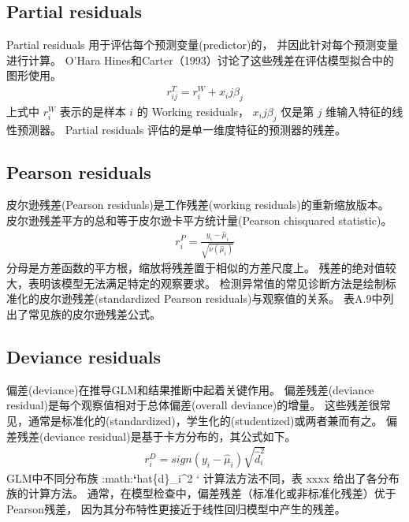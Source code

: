 \documentclass[letterpaper,10pt,english]{sphinxmanual}
\begin{document}
\subsection{Partial residuals}
\label{\detokenize{_u6a21_u578b_u8bc4_u4f30/content:partial-residuals}}
Partial residuals 用于评估每个预测变量(predictor)的，
并因此针对每个预测变量进行计算。
O’Hara Hines和Carter（1993）讨论了这些残差在评估模型拟合中的图形使用。
\begin{equation}\label{equation:模型评估/content:模型评估/content:30}
\begin{split}r^T_{ij} = r^W_{i} + x_ij \beta_j\end{split}
\end{equation}
上式中 \(r^W_{i}\) 表示的是样本 \(i\) 的 Working residuals，
\(x_ij \beta_j\) 仅是第 \(j\) 维输入特征的线性预测器。
Partial residuals 评估的是单一维度特征的预测器的残差。


\subsection{Pearson residuals}
\label{\detokenize{_u6a21_u578b_u8bc4_u4f30/content:pearson-residuals}}
皮尔逊残差(Pearson residuals)是工作残差(working residuals)的重新缩放版本。
皮尔逊残差平方的总和等于皮尔逊卡平方统计量(Pearson chi\sphinxhyphen{}squared statistic)。
\begin{equation}\label{equation:模型评估/content:模型评估/content:31}
\begin{split}r_i^P = \frac{y_i-\hat{\mu}_i}{\sqrt{\nu(\hat{\mu}_i)}}\end{split}
\end{equation}
分母是方差函数的平方根，缩放将残差置于相似的方差尺度上。
残差的绝对值较大，表明该模型无法满足特定的观察要求。
检测异常值的常见诊断方法是绘制标准化的皮尔逊残差(standardized Pearson residuals)与观察值的关系。
表A.9中列出了常见族的皮尔逊残差公式。


\subsection{Deviance residuals}
\label{\detokenize{_u6a21_u578b_u8bc4_u4f30/content:deviance-residuals}}
偏差(deviance)在推导GLM和结果推断中起着关键作用。
偏差残差(deviance residual)是每个观察值相对于总体偏差(overall deviance)的增量。
这些残差很常见，通常是标准化的(standardized)，学生化的(studentized)或两者兼而有之。
偏差残差(deviance residual)是基于卡方分布的，其公式如下。
\begin{equation}\label{equation:模型评估/content:模型评估/content:32}
\begin{split}r_i^D = sign(y_i - \hat{\mu}_i) \sqrt{ \hat{d}_i^2 }\end{split}
\end{equation}
GLM中不同分布族 :math:{\color{red}\bfseries{}`}hat\{d\}\_i\textasciicircum{}2 ` 计算法方法不同，表 xxxx 给出了各分布族的计算方法。
通常，在模型检查中，偏差残差（标准化或非标准化残差）优于Pearson残差，
因为其分布特性更接近于线性回归模型中产生的残差。
\end{document}
